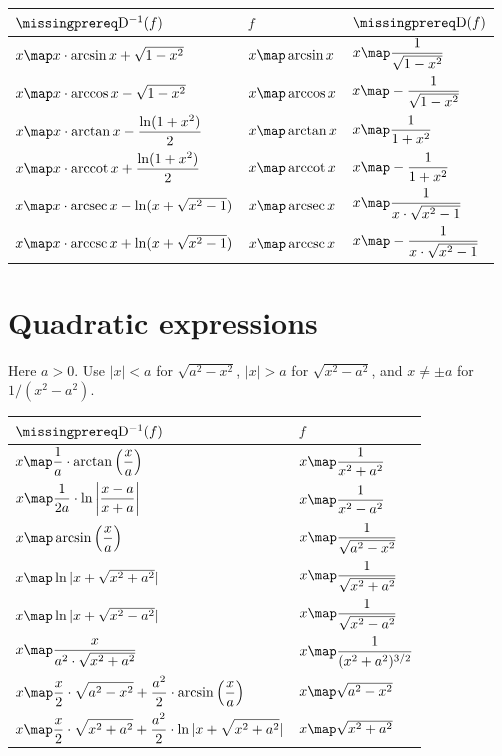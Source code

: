 \documentclass[10pt]{article}
\DeclareMathOperator{\arcsec}{arcsec}
\DeclareMathOperator{\arccsc}{arccsc}
\DeclareMathOperator{\arccot}{arccot}
\begin{document}
\begin{tabularx}{\textwidth}{|Y|Y|Y|}
\hline
$\DiffOp^{-1}(f)$ & $f$ & $\DiffOp(f)$ \\ \hline
$x\map x\cdot\arcsin x+\sqrt{1-x^2}$ & $x\map\arcsin x$ & $\displaystyle x\map\frac1{\sqrt{1-x^2}}$ \\ \hline
$x\map x\cdot\arccos x-\sqrt{1-x^2}$ & $x\map\arccos x$ & $\displaystyle x\map-\frac1{\sqrt{1-x^2}}$ \\ \hline
$\displaystyle x\map x\cdot\arctan x-\frac{\ln(1+x^2)}2$ & $x\map\arctan x$ & $\displaystyle x\map\frac1{1+x^2}$ \\ \hline
$\displaystyle x\map x\cdot\arccot x+\frac{\ln(1+x^2)}2$ & $x\map\arccot x$ & $\displaystyle x\map-\frac1{1+x^2}$ \\ \hline
$x\map x\cdot\arcsec x-\ln(x+\sqrt{x^2-1})$ & $x\map\arcsec x$ & $\displaystyle x\map\frac1{x\cdot\sqrt{x^2-1}}$ \\ \hline
$x\map x\cdot\arccsc x+\ln(x+\sqrt{x^2-1})$ & $x\map\arccsc x$ & $\displaystyle x\map-\frac1{x\cdot\sqrt{x^2-1}}$ \\ \hline
\end{tabularx}

\section*{Quadratic expressions}
Here $a>0$. Use $|x|<a$ for $\sqrt{a^2-x^2}$, $|x|>a$ for
$\sqrt{x^2-a^2}$, and $x\ne\pm a$ for $1/(x^2-a^2)$.

\begin{tabularx}{\textwidth}{|Y|Y|}
\hline
$\DiffOp^{-1}(f)$ & $f$ \\ \hline
$\displaystyle x\map\frac1a\cdot\arctan\left(\frac xa\right)$ & $\displaystyle x\map\frac1{x^2+a^2}$ \\ \hline
$\displaystyle x\map\frac1{2a}\cdot\ln\left|\frac{x-a}{x+a}\right|$ & $\displaystyle x\map\frac1{x^2-a^2}$ \\ \hline
$\displaystyle x\map\arcsin\left(\frac xa\right)$ & $\displaystyle x\map\frac1{\sqrt{a^2-x^2}}$ \\ \hline
$x\map\ln|x+\sqrt{x^2+a^2}|$ & $\displaystyle x\map\frac1{\sqrt{x^2+a^2}}$ \\ \hline
$x\map\ln|x+\sqrt{x^2-a^2}|$ & $\displaystyle x\map\frac1{\sqrt{x^2-a^2}}$ \\ \hline
$\displaystyle x\map\frac{x}{a^2\cdot\sqrt{x^2+a^2}}$ & $\displaystyle x\map\frac1{(x^2+a^2)^{3/2}}$ \\ \hline
$\displaystyle x\map\frac x2\cdot\sqrt{a^2-x^2}+\frac{a^2}{2}\cdot\arcsin\left(\frac xa\right)$ & $x\map\sqrt{a^2-x^2}$ \\ \hline
$\displaystyle x\map\frac x2\cdot\sqrt{x^2+a^2}+\frac{a^2}{2}\cdot\ln|x+\sqrt{x^2+a^2}|$ & $x\map\sqrt{x^2+a^2}$ \\ \hline
\end{tabularx}
\end{document}
